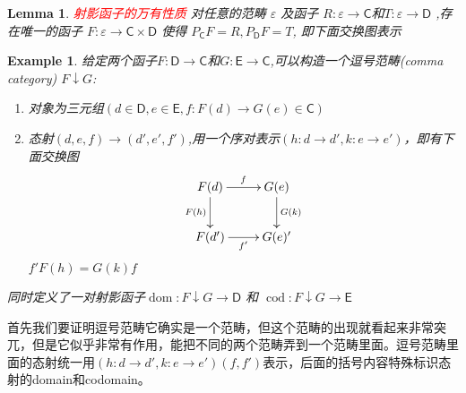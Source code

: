 \documentclass{article}
\newtheorem{lemma}[theorem]{Lemma}
\newtheorem{example}[theorem]{Example}
\newcommand*{\cat}[1]{\textsf{#1}\xspace}
\newcommand{\sC}{\mathsf{C}}
\newcommand{\sD}{\mathsf{D}}
\newcommand{\sE}{\mathsf{E}}
\newcommand*{\xfunc}[4]{{#2}\colon{#3}{#1}{#4}}
\newcommand*{\func}[3]{\xfunc{\to}{#1}{#2}{#3}}
\newcommand*{\qty}[1]{\left({#1}\right)}
\DeclareMathOperator{\dom}{dom}
\DeclareMathOperator{\cod}{cod}
\newcommand{\redt}[1]{\textcolor{red}{#1}}
\begin{document}
\begin{lemma}
\rm \redt{射影函子的万有性质} 对任意的范畴 $\varepsilon$ 及函子 $R\colon \varepsilon \rightarrow \cat{C}$和$T\colon \varepsilon \rightarrow \cat{D}$ ,存在唯一的函子 $F\colon \varepsilon \rightarrow \cat{C}\times\cat{D}$ 使得 $P_{\cat{C}}F=R,P_{\cat{D}}F=T$, 即下面交换图表示
\begin{center}
\end{center}
\end{lemma}


\begin{example}
\rm 给定两个函子$\func{F}{\sD}{\sC}$和$\func{G}{\sE}{\sC}$,可以构造一个逗号范畴(comma category) $F \downarrow G$:
	\begin{enumerate}
		\item 对象为三元组$(d \in \sD,e\in \sE,\func{f}{F(d)}{G(e)} \in \sC)$
		\item 态射$\qty{d,e,f} \rightarrow \qty{d',e',f'}$,用一个序对表示$\qty{\func{h}{d}{d'},\func{k}{e}{e'}}$，即有下面交换图
		\[\xymatrix{
					F(d) \ar[d]_{F(h)} \ar[r]^{f} & G(e)\ar[d]^{G(k)}  \\
			F(d')\ar[r]_{f'} &G(e)'}\]
			$f'F(h) = G(k)f$
	\end{enumerate}
	同时定义了一对射影函子$\func{\dom}{F\downarrow G}{\sD}$ 和
	$\func{\cod}{F\downarrow G}{\sE}$	
\end{example}

首先我们要证明逗号范畴它确实是一个范畴，但这个范畴的出现就看起来非常突兀，但是它似乎非常有作用，能把不同的两个范畴弄到一个范畴里面。逗号范畴里面的态射统一用$\qty{\func{h}{d}{d'},\func{k}{e}{e'}} \qty{f,f'}$表示，后面的括号内容特殊标识态射的domain和codomain。
\end{document}
